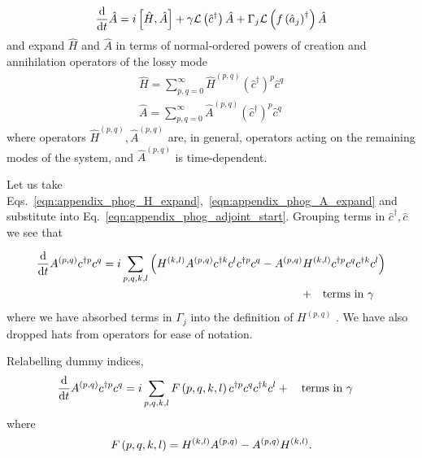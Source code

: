 \begin{equation}\label{eqn:appendix_phog_adjoint_start}
\frac{\mathrm{d}}{\mathrm{d}t} \hat{A} = i \left[ \hat{H}, \hat{A} \right] + \gamma \mathcal{L}\left(\hat{c}^\dagger \right) \hat{A} + \Gamma_j \mathcal{L} \left( f\left(\hat{a}_j\right)^\dagger\right) \hat{A}
\end{equation}
and expand $\hat{H}$ and $\hat{A}$ in terms of normal-ordered powers of creation and annihilation operators of the lossy mode
\begin{align}
\hat{H} = \sum_{p, q = 0}^{\infty} \hat{H}^{\left(p, q\right)} \left(\hat{c}^\dagger\right)^p \hat{c}^q \label{eqn:appendix_phog_H_expand}  \\
%
\hat{A} = \sum_{p, q = 0}^{\infty} \hat{A}^{\left(p, q\right)} \left(\hat{c}^\dagger \right)^p \hat{c}^q \label{eqn:appendix_phog_A_expand}
\end{align}
where operators $\hat{H}^{\left(p, q\right)}, \hat{A}^{\left(p, q\right)}$ are, in general, operators acting on the remaining modes of the system, and $\hat{A}^{\left(p, q\right)}$ is time-dependent.

Let us take Eqs.~\ref{eqn:appendix_phog_H_expand},~\ref{eqn:appendix_phog_A_expand} and substitute into Eq.~\ref{eqn:appendix_phog_adjoint_start}. Grouping terms in $\hat{c}^\dagger, \hat{c}$ we see that 

\begin{align}
\ddt A^{\left(p, q\right)} c^{\dagger p} c^q = i \sum_{p, q, k, l} \left(H^{\left(k, l\right)} A^{\left(p, q\right)} c^{\dagger k} c^{l} c^{\dagger p} c^q - A^{\left(p, q\right)} H^{\left(k, l\right)} c^{\dagger p} c^q c^{\dagger k} c^l\right)& \notag \\
%
+ \qq{terms in $\gamma$}&
\end{align}
where we have absorbed terms in $\Gamma_j$ into the definition of $H^{\left(p, q\right)}$ . We have also dropped hats from operators for ease of notation.

Relabelling dummy indices,
\begin{equation}\label{eqn:appendix_phog_Apq}
\ddt A^{\left(p, q\right)} c^{\dagger p} c^q = i \sum_{p, q, k, l} F\left(p, q, k, l\right) c^{\dagger p} c^{q} c^{\dagger k} c^l + \qq{terms in $\gamma$}
\end{equation}
where
\begin{equation}
F\left(p, q, k, l\right) = H^{\left(k, l\right)} A^{\left(p, q\right)} - A^{\left(p, q\right)} H^{\left(k, l\right)}. \notag
\end{equation}

